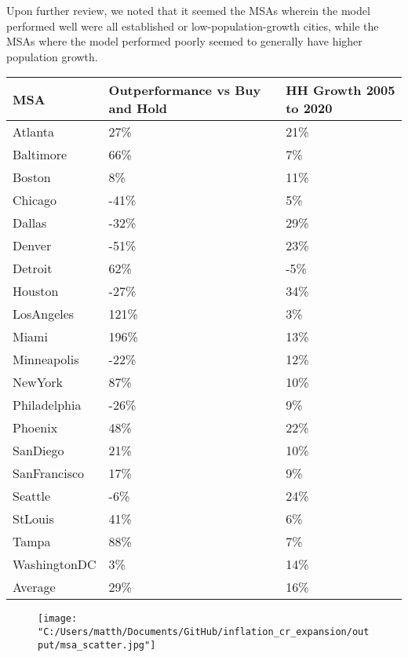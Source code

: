 Upon further review, we noted that it seemed the MSAs wherein the model performed well were all established or low-population-growth cities, while the MSAs where the model performed poorly seemed to generally have higher population growth. 

\begin{table}[!ht]
    \centering
    \begin{tabular}{|l|p{2cm}|p{2cm}|}
    \hline
        MSA & Outperformance vs Buy and Hold & HH Growth 2005 to 2020 \\ \hline
        Atlanta & 27\% & 21\% \\ \hline
        Baltimore & 66\% & 7\% \\ \hline
        Boston & 8\% & 11\% \\ \hline
        Chicago & -41\% & 5\% \\ \hline
        Dallas & -32\% & 29\% \\ \hline
        Denver & -51\% & 23\% \\ \hline
        Detroit & 62\% & -5\% \\ \hline
        Houston & -27\% & 34\% \\ \hline
        LosAngeles & 121\% & 3\% \\ \hline
        Miami & 196\% & 13\% \\ \hline
        Minneapolis & -22\% & 12\% \\ \hline
        NewYork & 87\% & 10\% \\ \hline
        Philadelphia & -26\% & 9\% \\ \hline
        Phoenix & 48\% & 22\% \\ \hline
        SanDiego & 21\% & 10\% \\ \hline
        SanFrancisco & 17\% & 9\% \\ \hline
        Seattle & -6\% & 24\% \\ \hline
        StLouis & 41\% & 6\% \\ \hline
        Tampa & 88\% & 7\% \\ \hline
        WashingtonDC & 3\% & 14\% \\ \hline
        Average & 29\% & 16\% \\ \hline
    \end{tabular}
\end{table}

\begin{figure}
\texttt{[image: "C:/Users/matth/Documents/GitHub/inflation\_cr\_expansion/output/msa\_scatter.jpg"]}
\end{figure}


